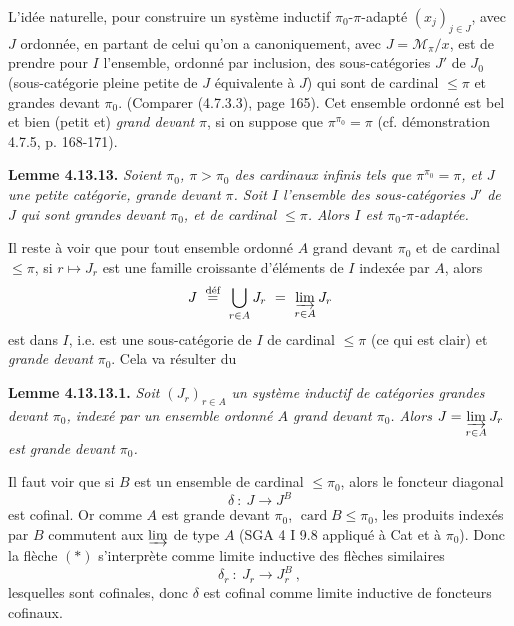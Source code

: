 L'idée naturelle, pour construire un système inductif $\pi_0$-$\pi$-adapté $(x_j)_{j\in J}$, avec $J$ ordonnée, en partant de celui qu'on a canoniquement, avec $J = \mathcal{M}_\pi/x$, est de prendre pour $I$ l'ensemble, ordonné par inclusion, des sous-catégories $J'$ de $J_0$ (sous-catégorie pleine petite de $J$ équivalente à $J$) qui sont de cardinal $\leqslant \pi$ et grandes devant $\pi_0$. (Comparer (4.7.3.3), page 165). Cet ensemble ordonné est bel et bien (petit et) \textit{grand devant} $\pi$, si on suppose que $\pi^{\pi_0} = \pi$ (cf. démonstration 4.7.5, p. 168-171).

\noindent\textbf{Lemme 4.13.13.} \textit{Soient $\pi_0$, $\pi > \pi_0$ des cardinaux infinis tels que $\pi^{\pi_0} = \pi$, et $J$ une petite catégorie, grande devant $\pi$. Soit $I$ l'ensemble des sous-catégories $J'$ de $J$ qui sont grandes devant $\pi_0$, et de cardinal $\leqslant \pi$. Alors $I$ est $\pi_0$-$\pi$-adaptée.}

Il reste à voir que pour tout ensemble ordonné $A$ grand devant $\pi_0$ et de cardinal $\leqslant \pi$, si $r \longmapsto J_r$ est une famille croissante d'éléments de $I$ indexée par $A$, alors
\[
J \ \overset{\text{déf}}{=} \ \bigcup_{r\in A} J_r \ = \ \varinjlim_{r\in A} J_r
\]
est dans $I$, i.e. est une sous-catégorie de $I$ de cardinal $\leqslant \pi$ (ce qui est clair) et \textit{grande devant} $\pi_0$. Cela va résulter du


\noindent\textbf{Lemme 4.13.13.1.} \textit{Soit $(J_r)_{r\in A}$ un système inductif de catégories grandes devant $\pi_0$, indexé par un ensemble ordonné $A$ grand devant $\pi_0$. Alors $J = \varinjlim\limits_{r\in A} J_r$ est grande devant $\pi_0$.}

\noindent Il faut voir que si $B$ est un ensemble de cardinal $\leqslant \pi_0$, alors le foncteur diagonal
\[
\delta \ : \ J \longrightarrow J^B \tag*{$(*)$}
\]
est cofinal. Or comme $A$ est grande devant $\pi_0$, $\operatorname{card} B \leqslant \pi_0$, les produits indexés par $B$ commutent aux $\varinjlim$ de type $A$ (SGA 4 I 9.8 appliqué à Cat et à $\pi_0$). Donc la flèche $(*)$ s'interprète comme limite inductive des flèches similaires
\[
\delta_r \ : \ J_r \longrightarrow J_r^B \ , \tag*{$(**)$}
\]
lesquelles sont cofinales, donc $\delta$ est cofinal comme limite inductive de foncteurs cofinaux.

